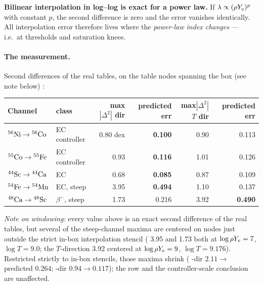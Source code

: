 \begin{result}
\textbf{Bilinear interpolation in log--log is exact for a power law.} If
$\lambda \propto (\rhoye)^p$ with constant $p$, the second difference is zero
and the error vanishes identically. All interpolation error therefore lives
where the \emph{power-law index changes} --- i.e.\ at thresholds and saturation
knees.
\end{result}

\paragraph{The measurement.} Second differences of the real tables, on the table
nodes spanning the box (see note below) \derivedhere{}:

\begin{center}
\begin{tabularx}{\textwidth}{@{}L{2.5cm} L{2.4cm} R{0.95} R{1.0} R{0.95} R{1.1}@{}}
\toprule
\textbf{Channel} & \textbf{class} & \textbf{max$|\Delta^2|$ \rhoye{} dir}
  & \textbf{predicted err} & \textbf{max$|\Delta^2|$ $T$ dir}
  & \textbf{predicted err} \\
\midrule
$\nuc{Ni}{56} \to \nuc{Co}{56}$ & EC controller & 0.80 dex & \textbf{0.100}
  & 0.90 & 0.113 \\
$\nuc{Co}{55} \to \nuc{Fe}{55}$ & EC controller & 0.93 & \textbf{0.116}
  & 1.01 & 0.126 \\
$\nuc{Sc}{44} \to \nuc{Ca}{44}$ & EC & 0.68 & \textbf{0.085} & 0.87 & 0.109 \\
$\nuc{Fe}{54} \to \nuc{Mn}{54}$ & EC, steep & 3.95 & \textbf{0.494}
  & 1.10 & 0.137 \\
$\nuc{Ca}{48} \to \nuc{Sc}{48}$ & $\beta^-$, steep & 1.73 & 0.216
  & 3.92 & \textbf{0.490} \\
\bottomrule
\end{tabularx}
\end{center}

\emph{Note on windowing:} every value above is an exact second difference of the
real tables, but several of the steep-channel maxima are centered on nodes just
outside the strict in-box interpolation stencil ( 3.95 and
 1.73 both at $\log\rhoye = 7$, $\log T = 9.0$; the 
$T$-direction 3.92 centered at $\log\rhoye = 9$, $\log T = 9.176$). Restricted
strictly to in-box stencils, those maxima shrink ( \rhoye-dir
$2.11 \to$ predicted 0.264;  \rhoye-dir $0.94 \to 0.117$); the
 row and the controller-scale conclusion are unaffected.


